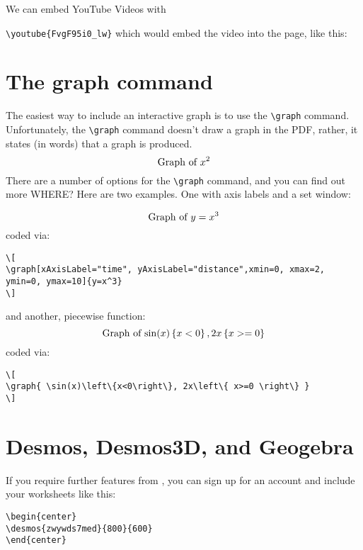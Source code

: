 \documentclass{ximera}
\begin{document}
We can embed YouTube Videos with

\verb|\youtube{FvgF95i0_lw}| which would embed the video into the page, like
this:
\begin{center}
\end{center}

\section{The graph command}

The easiest way to include an interactive graph is to use the
\verb|\graph| command. Unfortunately, the \verb|\graph| command
doesn't draw a graph in the PDF, rather, it states (in words) that a
graph is produced.
\[
  \graph{x^2}
\]
There are a number of options for the \verb|\graph| command, and you can find
out more WHERE?
Here are two examples. One with axis labels and a set window:

\[
  \graph[xAxisLabel="time", yAxisLabel="distance",xmin=0, xmax=10, ymin=0,
    ymax=10]{y=x^3}
\]
coded via:
\begin{verbatim}
\[
\graph[xAxisLabel="time", yAxisLabel="distance",xmin=0, xmax=2, ymin=0, ymax=10]{y=x^3}
\]
\end{verbatim}

and another, piecewise function:
\[
  \graph{ \sin(x)\left\{x<0\right\}, 2x\left\{ x>=0 \right\} }
\]
coded via:
\begin{verbatim}
\[
\graph{ \sin(x)\left\{x<0\right\}, 2x\left\{ x>=0 \right\} }
\]
\end{verbatim}

\section{Desmos, Desmos3D, and Geogebra}

If you require further features from
, you can sign up for an account
and include your worksheets like this:

\begin{verbatim}
\begin{center}
\desmos{zwywds7med}{800}{600}
\end{center}
\end{verbatim}
\begin{center}
\end{center}
\end{document}
